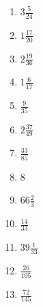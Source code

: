 \documentclass[12pt]{article}
\begin{document}
\begin{enumerate}
\item $ 3 \frac{5}{24} $
\item $ 1 \frac{17}{20} $
\item $ 2 \frac{19}{36} $
\item $ 1 \frac{6}{17} $
\item $ \frac{9}{35} $
\item $ 2 \frac{37}{49} $
\item $ \frac{33}{85} $
\item $ 8 $
\item $ 66 \frac{2}{3} $
\item $ \frac{14}{33} $
\item $ 39 \frac{1}{33} $
\item $ \frac{26}{105} $
\item $ \frac{72}{145} $
\end{enumerate}
\newpage
\end{document}

